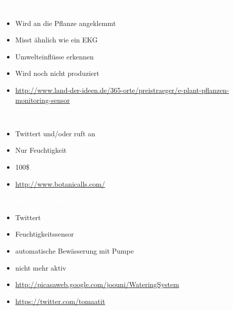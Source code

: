 \documentclass[bigger]{beamer}
\newcommand{\topic}[1]{{\huge{\textcolor{white}{\textbf{#1}}}}}
\begin{document}
\begin{frame}{\topic{E-Plant}}
	\begin{itemize}
		\item Wird an die Pflanze angeklemmt
		\item Misst ähnlich wie ein EKG
		\item Umwelteinflüsse erkennen
		\item Wird noch nicht produziert
		\item \url{http://www.land-der-ideen.de/365-orte/preistraeger/e-plant-pflanzen-monitoring-sensor}
	\end{itemize}
\end{frame}

\begin{frame}{\topic{Botanicalls}}
	\begin{itemize}
		\item Twittert und/oder ruft an
		\item Nur Feuchtigkeit
		\item 100\$
		\item \url{http://www.botanicalls.com/}
	\end{itemize}
\end{frame}

\begin{frame}{\topic{Tomato Irrigation Project}}
	\begin{itemize}
		\item Twittert
		\item Feuchtigkeitssensor
		\item automatische Bewässerung mit Pumpe
		\item nicht mehr aktiv
		\item \url{http://picasaweb.google.com/joouni/WateringSystem}
		\item \url{https://twitter.com/tomaatit}
	\end{itemize}
\end{frame}
\end{document}
